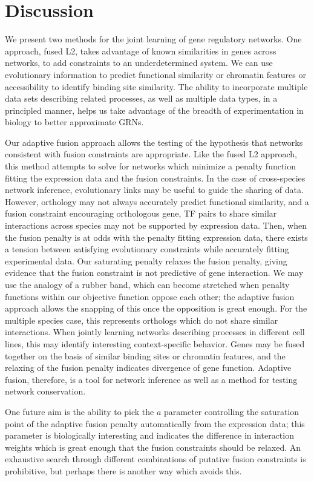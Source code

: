 \documentclass[11pt]{article}
\begin{document}
\section{Discussion}
We present two methods for the joint learning of gene regulatory networks. One approach, fused L2, takes advantage of known similarities in genes across networks, to add constraints to an underdetermined system. We can use evolutionary information to predict functional similarity or chromatin features or accessibility to identify binding site similarity. The ability to incorporate multiple data sets describing related processes, as well as multiple data types, in a principled manner, helps us take advantage of the breadth of experimentation in biology to better approximate GRNs. 

Our adaptive fusion approach allows the testing of the hypothesis that networks consistent with fusion constraints are appropriate. Like the fused L2 approach, this method attempts to solve for networks which minimize a penalty function fitting the expression data and the fusion constraints. In the case of cross-species network inference, evolutionary links may be useful to guide the sharing of data. However, orthology may not always accurately predict functional similarity, and a fusion constraint encouraging orthologous gene, TF pairs to share similar interactions across species may not be supported by expression data. Then, when the fusion penalty is at odds with the penalty fitting expression data, there exists a tension between satisfying evolutionary constraints while accurately fitting experimental data. Our saturating penalty relaxes the fusion penalty, giving evidence that the fusion constraint is not predictive of gene interaction. We may use the analogy of a rubber band, which can become stretched when penalty functions within our objective function oppose each other; the adaptive fusion approach allows the snapping of this once the opposition is great enough. For the multiple species case, this represents orthologs which do not share similar interactions. When jointly learning networks describing processes in different cell lines, this may identify interesting context-specific behavior. Genes may be fused together on the basis of similar binding sites or chromatin features, and the relaxing of the fusion penalty indicates divergence of gene function. Adaptive fusion, therefore, is a tool for network inference as well as a method for testing network conservation. 

One future aim is the ability to pick the $a$ parameter controlling the saturation point of the adaptive fusion penalty automatically from the expression data; this parameter is biologically interesting and indicates the difference in interaction weights which is great enough that the fusion constraints should be relaxed. An exhaustive search through different combinations of putative fusion constraints is prohibitive, but perhaps there is another way which avoids this. 




\end{document}
